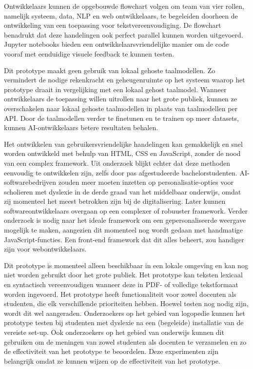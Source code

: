 \medspace

Ontwikkelaars kunnen de opgebouwde flowchart volgen om team van vier rollen, namelijk systeem, data, NLP en web ontwikkelaars, te begeleiden doorheen de ontwikkeling van een toepassing voor tekstvereenvoudiging. De flowchart benadrukt dat deze handelingen ook perfect parallel kunnen worden uitgevoerd. Jupyter notebooks bieden een ontwikkelaarsvriendelijke manier om de code vooraf met eenduidige visuele feedback te kunnen testen.

\medspace

Dit prototype maakt geen gebruik van lokaal gehoste taalmodellen. Zo vermindert de nodige rekenkracht en geheugenruimte op het systeem waarop het prototype draait in vergelijking met een lokaal gehost taalmodel. Wanneer ontwikkelaars de toepassing willen uitrollen naar het grote publiek, kunnen ze overschakelen naar lokaal gehoste taalmodellen in plaats van taalmodellen per API. Door de taalmodellen verder te finetunen en te trainen op meer datasets, kunnen AI-ontwikkelaars betere resultaten behalen. 

\medspace

Het ontwikkelen van gebruikersvriendelijke handelingen kan gemakkelijk en snel worden ontwikkeld met behulp van HTML, CSS en JavaScript, zonder de nood van een complex framework. Uit onderzoek blijkt echter dat deze methoden eenvoudig te ontwikkelen zijn, zelfs door pas afgestudeerde bachelorstudenten. AI-softwarebedrijven zouden meer moeten inzetten op personalisatie-opties voor scholieren met dyslexie in de derde graad van het middelbaar onderwijs, omdat zij momenteel het meest betrokken zijn bij de digitalisering. Later kunnen softwareontwikkelaars overgaan op een complexer of robuuster framework. Verder onderzoek is nodig naar het ideale framework om een gepersonaliseerde weergave mogelijk te maken, aangezien dit momenteel nog wordt gedaan met handmatige JavaScript-functies. Een front-end framework dat dit alles beheert, zou handiger zijn voor webontwikkelaars.

\medspace

Dit prototype is momenteel alleen beschikbaar in een lokale omgeving en kan nog niet worden gebruikt door het grote publiek. Het prototype kan teksten lexicaal en syntactisch vereenvoudigen wanneer deze in PDF- of volledige tekstformaat worden ingevoerd. Het prototype heeft functionaliteit voor zowel docenten als studenten, die elk verschillende prioriteiten hebben. Hoewel testen nog nodig zijn, wordt dit wel aangeraden. Onderzoekers op het gebied van logopedie kunnen het prototype testen bij studenten met dyslexie na een (begeleide) installatie van de vereiste set-up. Ook onderzoekers op het gebied van onderwijs kunnen dit gebruiken om de meningen van zowel studenten als docenten te verzamelen en zo de effectiviteit van het prototype te beoordelen. Deze experimenten zijn belangrijk omdat ze kunnen wijzen op de effectiviteit van het prototype.

